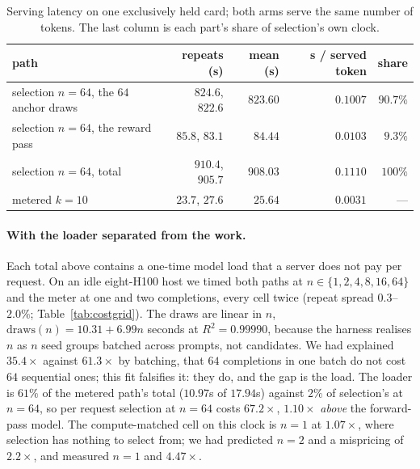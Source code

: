 \begin{table}[ht]
\centering\footnotesize
\caption{Serving latency on one exclusively held card; both arms serve the same number of tokens. The
last column is each part's share of selection's own clock.}\label{tab:latency}
\setlength{\tabcolsep}{5pt}
\begin{tabular}{@{}lrrrr@{}}
\toprule
path & repeats (s) & mean (s) & s / served token & share \\
\midrule
selection $n=64$, the $64$ anchor draws & $824.6$, $822.6$ & $823.60$ & $0.1007$ & $\mathbf{90.7\%}$ \\
selection $n=64$, the reward pass       & $85.8$, $83.1$   & $84.44$  & $0.0103$ & $9.3\%$ \\
selection $n=64$, total                 & $910.4$, $905.7$ & $908.03$ & $0.1110$ & $100\%$ \\
metered $k=10$                          & $23.7$, $27.6$   & $25.64$  & $0.0031$ & --- \\
\bottomrule
\end{tabular}
\end{table}

\paragraph{With the loader separated from the work.}\label{app:costgrid}
Each total above contains a one-time model load that a server does not pay per request. On an idle
eight-H100 host we timed both paths at $n \in \{1,2,4,8,16,64\}$ and the meter at one and two
completions, every cell twice (repeat spread $0.3$--$2.0\%$; Table~\ref{tab:costgrid}). The draws are
linear in $n$, $\mathrm{draws}(n) = 10.31 + 6.99n$ seconds at $R^2 = 0.99990$, because the harness realises
$n$ as $n$ seed groups batched across prompts, not candidates. We had explained $35.4\times$ against $61.3\times$ by batching, that $64$ completions in one batch do not cost $64$ sequential ones; this fit falsifies it: they do, and the gap is the load. The loader is $61\%$ of the metered path's
total ($10.97$s of $17.94$s) against $2\%$ of selection's at $n=64$, so per request selection at $n=64$
costs $67.2\times$, $1.10\times$ \emph{above} the forward-pass model. The compute-matched cell on this
clock is $n=1$ at $1.07\times$, where selection has nothing to select from; we had predicted $n=2$ and a
mispricing of $2.2\times$, and measured $n=1$ and $4.47\times$.

